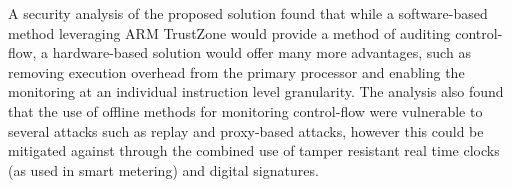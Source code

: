 A security analysis of the proposed solution found that while a software-based method leveraging ARM TrustZone would provide a method of auditing control-flow, a hardware-based solution would offer many more advantages, such as removing execution overhead from the primary processor and enabling the monitoring at an individual instruction level granularity. The analysis also found that the use of offline methods for monitoring control-flow were vulnerable to several attacks such as replay and proxy-based attacks, however this could be mitigated against through the combined use of tamper resistant real time clocks (as used in smart metering) and digital signatures.

